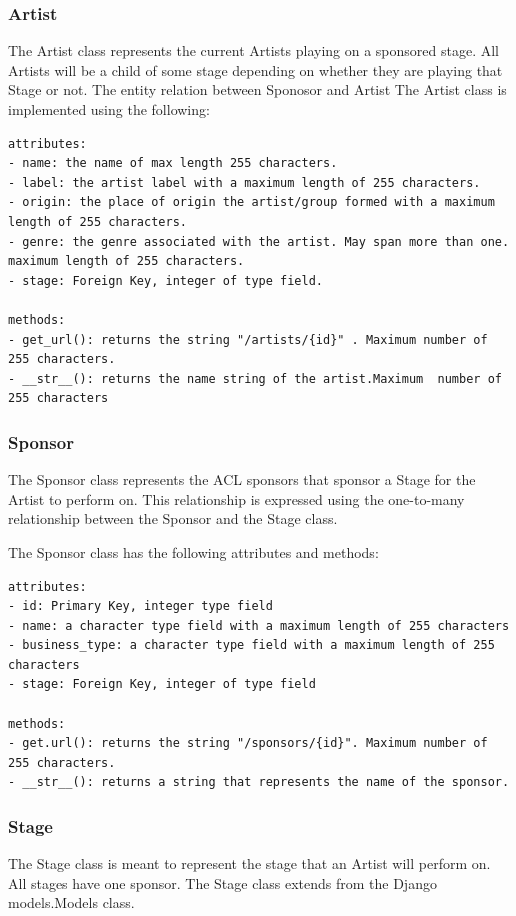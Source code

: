 \documentclass[12pt,english]{scrartcl}
\begin{document}
\subsubsection{Artist}
The Artist class represents the current Artists playing on a sponsored stage. All Artists will be a child of some
stage depending on whether they are playing that Stage or not. The entity relation between Sponosor and Artist  The Artist class is implemented using the following:
\begin{verbatim}
attributes:
- name: the name of max length 255 characters.
- label: the artist label with a maximum length of 255 characters.
- origin: the place of origin the artist/group formed with a maximum length of 255 characters.
- genre: the genre associated with the artist. May span more than one. maximum length of 255 characters.
- stage: Foreign Key, integer of type field.

methods:
- get_url(): returns the string "/artists/{id}" . Maximum number of 255 characters.
- __str__(): returns the name string of the artist.Maximum  number of 255 characters
\end{verbatim}


\subsubsection{Sponsor}
The Sponsor class represents the ACL sponsors that sponsor a Stage for the Artist to perform on.
This relationship is expressed using the one-to-many relationship between the Sponsor and the Stage
class. 

The Sponsor class has the following attributes and methods:
\begin{verbatim}
attributes:
- id: Primary Key, integer type field
- name: a character type field with a maximum length of 255 characters
- business_type: a character type field with a maximum length of 255 characters
- stage: Foreign Key, integer of type field

methods:
- get.url(): returns the string "/sponsors/{id}". Maximum number of 255 characters.
- __str__(): returns a string that represents the name of the sponsor.
\end{verbatim}

\subsubsection{Stage}
The Stage class is meant to represent the stage that an Artist will perform on. All stages
have one sponsor. The Stage class extends from the Django models.Models class.
\end{document}
